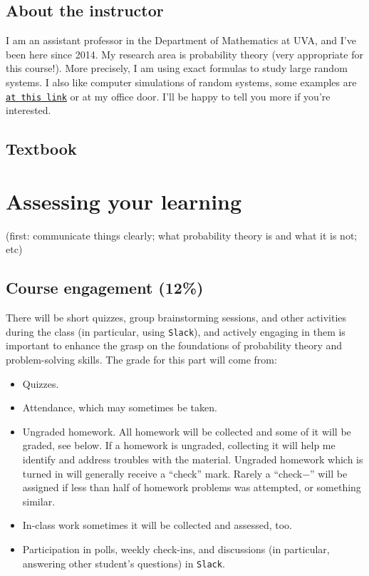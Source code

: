 \documentclass[oneside,11pt]{amsart}
\newcommand{\note}[1]{{\Large\sf{}\color{blue}(#1)}}
\begin{document}
\subsection{About the instructor}
I am an assistant professor in the Department of Mathematics at UVA, and I've
been here since 2014. My research area is probability theory (very appropriate
for this course!). More precisely, I am using exact formulas to study large
random systems. I also like computer simulations of random systems, some
examples are
\href{http://faculty.virginia.edu/petrov//blog/2016/09/16/random-heart/}{\texttt{at
this link}} or at my office door.
I'll be 
happy to tell you more if you're interested.

\subsection{Textbook}

\section{Assessing your learning}

\note{first: communicate things clearly; what probability theory is and what it is not; etc}

\subsection{Course engagement (12\%)}

There will be short quizzes, group brainstorming sessions, 
and other activities during the class
(in particular, using \texttt{Slack}),
and actively engaging in them is important to enhance 
the grasp on the foundations of probability theory and
problem-solving skills.
The grade for this part will come from: 
\begin{itemize}
	\item Quizzes.
	\item Attendance, which may sometimes be taken.
	\item Ungraded homework. All homework will be collected and some of it will be graded, see below.
	If a homework is ungraded, collecting
	it will help me identify and address 
	troubles with the material. Ungraded homework which is turned in will generally receive a ``check'' mark.
	Rarely a ``check$-$'' will be assigned if less than half of homework
	problems was attempted, or something similar.
	\item In-class work sometimes it will be collected
	and assessed, too.
	\item 
	Participation in
	polls, weekly check-ins, and
	discussions (in particular, answering other student's questions)
	in \texttt{Slack}.
\end{itemize}
\end{document}
